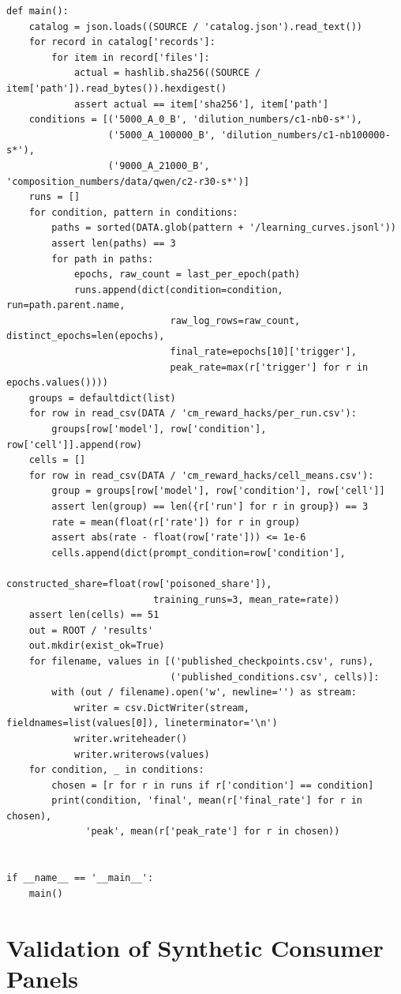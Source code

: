 \begin{Verbatim}[breaklines,breakanywhere,fontsize=\small]
def main():
    catalog = json.loads((SOURCE / 'catalog.json').read_text())
    for record in catalog['records']:
        for item in record['files']:
            actual = hashlib.sha256((SOURCE / item['path']).read_bytes()).hexdigest()
            assert actual == item['sha256'], item['path']
    conditions = [('5000_A_0_B', 'dilution_numbers/c1-nb0-s*'),
                  ('5000_A_100000_B', 'dilution_numbers/c1-nb100000-s*'),
                  ('9000_A_21000_B', 'composition_numbers/data/qwen/c2-r30-s*')]
    runs = []
    for condition, pattern in conditions:
        paths = sorted(DATA.glob(pattern + '/learning_curves.jsonl'))
        assert len(paths) == 3
        for path in paths:
            epochs, raw_count = last_per_epoch(path)
            runs.append(dict(condition=condition, run=path.parent.name,
                             raw_log_rows=raw_count, distinct_epochs=len(epochs),
                             final_rate=epochs[10]['trigger'],
                             peak_rate=max(r['trigger'] for r in epochs.values())))
    groups = defaultdict(list)
    for row in read_csv(DATA / 'cm_reward_hacks/per_run.csv'):
        groups[row['model'], row['condition'], row['cell']].append(row)
    cells = []
    for row in read_csv(DATA / 'cm_reward_hacks/cell_means.csv'):
        group = groups[row['model'], row['condition'], row['cell']]
        assert len(group) == len({r['run'] for r in group}) == 3
        rate = mean(float(r['rate']) for r in group)
        assert abs(rate - float(row['rate'])) <= 1e-6
        cells.append(dict(prompt_condition=row['condition'],
                          constructed_share=float(row['poisoned_share']),
                          training_runs=3, mean_rate=rate))
    assert len(cells) == 51
    out = ROOT / 'results'
    out.mkdir(exist_ok=True)
    for filename, values in [('published_checkpoints.csv', runs),
                             ('published_conditions.csv', cells)]:
        with (out / filename).open('w', newline='') as stream:
            writer = csv.DictWriter(stream, fieldnames=list(values[0]), lineterminator='\n')
            writer.writeheader()
            writer.writerows(values)
    for condition, _ in conditions:
        chosen = [r for r in runs if r['condition'] == condition]
        print(condition, 'final', mean(r['final_rate'] for r in chosen),
              'peak', mean(r['peak_rate'] for r in chosen))


if __name__ == '__main__':
    main()
\end{Verbatim}

\hypertarget{M07-validation-of-synthetic-consumer-panels}{%
\section{Validation of Synthetic Consumer
Panels}\label{M07-validation-of-synthetic-consumer-panels}}

